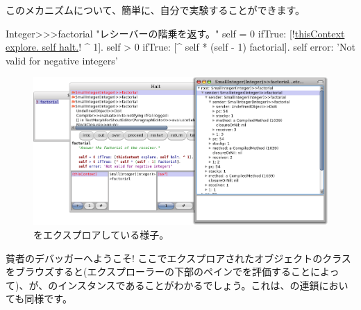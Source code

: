 \documentclass[a4paper,10pt,twoside]{book}
\begin{document}
このメカニズムについて、簡単に、自分で実験することができます。


\begin{code}{}
Integer>>>factorial
	"レシーバーの階乗を返す。"
	self = 0 ifTrue: [!\underline{thisContext explore. self halt.}! ^ 1].
	self > 0 ifTrue: [^ self * (self - 1) factorial].
	self error: 'Not valid for negative integers'
\end{code}


\begin{figure}[ht]\centering
	\includegraphics[width=\linewidth]{exploringThisContext}
	\caption{をエクスプロアしている様子。}
\end{figure}

貧者のデバッガーへようこそ!
ここでエクスプロアされたオブジェクトのクラスをブラウズすると(\ie エクスプローラーの下部のペインでを評価することによって)、が、のインスタンスであることがわかるでしょう。これは、の連鎖においても同様です。
\end{document}
